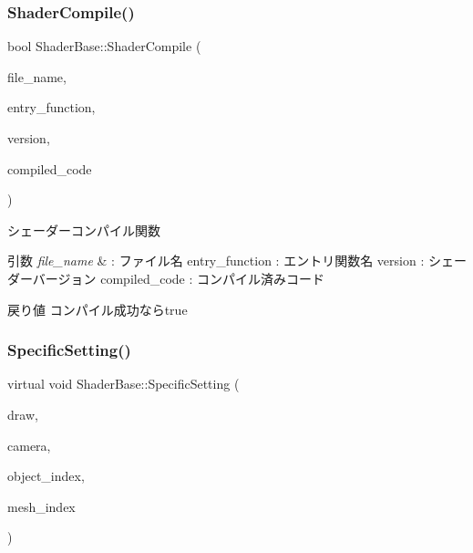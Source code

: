 \mbox{\label{class_shader_base_ac6e791440374f97592cfb4cb36f4fa55}} 
\subsubsection{\texorpdfstring{Shader\+Compile()}{ShaderCompile()}}
{\footnotesize\ttfamily bool Shader\+Base\+::\+Shader\+Compile (\begin{DoxyParamCaption}\item[{const char $\ast$}]{file\+\_\+name,  }\item[{const char $\ast$}]{entry\+\_\+function,  }\item[{const char $\ast$}]{version,  }\item[{L\+P\+D3\+D\+X\+B\+U\+F\+F\+ER $\ast$}]{compiled\+\_\+code }\end{DoxyParamCaption})\hspace{0.3cm}{\ttfamily [inline]}}



シェーダーコンパイル関数 


\begin{DoxyParams}{引数}
{\em file\+\_\+name} & \+: ファイル名 entry\+\_\+function \+: エントリ関数名 version \+: シェーダーバージョン compiled\+\_\+code \+: コンパイル済みコード \\
\hline
\end{DoxyParams}
\begin{DoxyReturn}{戻り値}
コンパイル成功ならtrue 
\end{DoxyReturn}
\mbox{\label{class_shader_base_ac78c78ede3b8e48cf28b739b97456620}} 
\subsubsection{\texorpdfstring{Specific\+Setting()}{SpecificSetting()}}
{\footnotesize\ttfamily virtual void Shader\+Base\+::\+Specific\+Setting (\begin{DoxyParamCaption}\item[{\mbox{\hyperlink{class_draw_base}{Draw\+Base}} $\ast$}]{draw,  }\item[{\mbox{\hyperlink{class_camera}{Camera}} $\ast$}]{camera,  }\item[{unsigned}]{object\+\_\+index,  }\item[{unsigned}]{mesh\+\_\+index }\end{DoxyParamCaption})\hspace{0.3cm}{\ttfamily [pure virtual]}}



